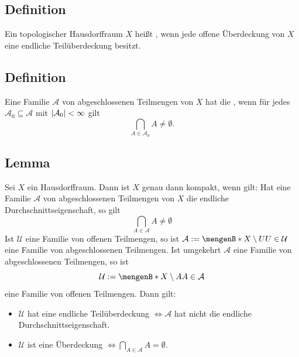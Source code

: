 \subsection[Definition: Kompaktheit]{Definition} %
\label{sub:42}
Ein topologischer Hausdorffraum $X$ heißt , wenn jede offene Überdeckung von $X$ eine endliche Teilüberdeckung besitzt.

\subsection[Definition: Endliche Durchschnittseigenschaft]{Definition} %
\label{sub:43}
Eine Familie $\mathcal{A}$ von abgeschlossenen Teilmengen von $X$ hat die , wenn für jedes $\mathcal{A}_0 \subseteq \mathcal{A}$ mit
$\abs*{\mathcal{A}_0 } < \infty$ gilt 
\[
	\bigcap_{A \in \mathcal{A}_0 } A \not= \emptyset.
\]

\subsection[Lemma: Äquivalenz zur Kompaktheit eines Hausdorffraumes]{Lemma} %
\label{sub:44}
Sei $X$ ein Hausdorffraum. Dann ist $X$ genau dann kompakt, wenn gilt: Hat eine Familie $\mathcal{A}$ von abgeschlossenen Teilmengen von $X$ die endliche 
Durchschnittseigenschaft, so gilt 
\[
	\bigcap_{A \in \mathcal{A}} A \not= \emptyset
\]
Ist $\mathcal{U}$ eine Familie von offenen Teilmengen, so ist $\mathcal{A} := \set[X \setminus U]{U \in \mathcal{U}}$ eine Familie von abgeschlossenen Teilmengen. Ist
umgekehrt $\mathcal{A}$ eine Familie von abgeschlossenen Teilmengen, so ist 
\[
	\mathcal{U} := \set[X \setminus A]{A \in \mathcal{A} } 
\]
eine Familie von offenen Teilmengen.
Dann gilt: 
\begin{itemize}
	\item $\mathcal{U}$ hat eine endliche Teilüberdeckung $\iff \mathcal{A}$ hat nicht die endliche Durchschnittseigenschaft.
	\item $\mathcal{U}$ ist eine Überdeckung $\iff \bigcap_{A \in \mathcal{A} }A = \emptyset$. \bewende
\end{itemize}

